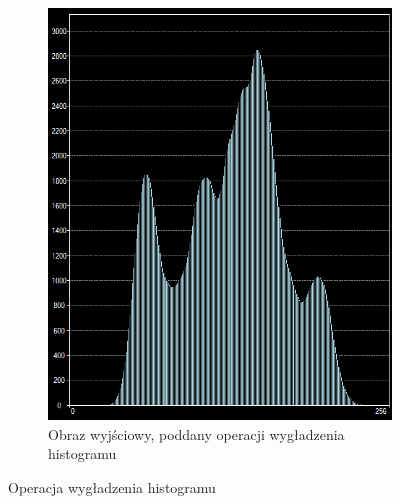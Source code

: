 \begin{figure}
\begin{subfigure}[b]{0.45\textwidth}
    \includegraphics[width=\textwidth]{img/smooth-histogram-after}
    \caption{Obraz wyjściowy, poddany operacji wygładzenia histogramu}
    \label{fig:equalize_histogram_after}
  \end{subfigure}
  \caption{Operacja wygładzenia histogramu}\label{fig:histogram_smooth}
\end{figure}
